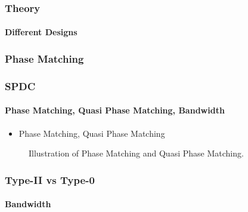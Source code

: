 \documentclass[serif,8pt]{beamer}
\begin{document}
{{\begin{frame}[t]
	\frametitle{Theory}
	\framesubtitle{Different Designs}
	\begin{figure}
		\begin{center}
		\end{center}
		\caption{}\label{whoisthis?}
	\end{figure}
\end{frame}

\subsubsection{Phase Matching}
\begin{frame}
	\frametitle{SPDC}
	\framesubtitle{Phase Matching, Quasi Phase Matching, Bandwidth}
	\begin{itemize}
		\item Phase Matching, Quasi Phase Matching
	\end{itemize}

	\begin{figure}
		\begin{center}
		  \quad
		\end{center}
		\caption{Illustration of Phase Matching and Quasi Phase Matching.}\label{fig:SPDCk}
	\end{figure}
\end{frame}

\begin{frame}[t]
	\frametitle{Type-II vs Type-0}
	\framesubtitle{Bandwidth}
	

\end{frame}}}
\end{document}

